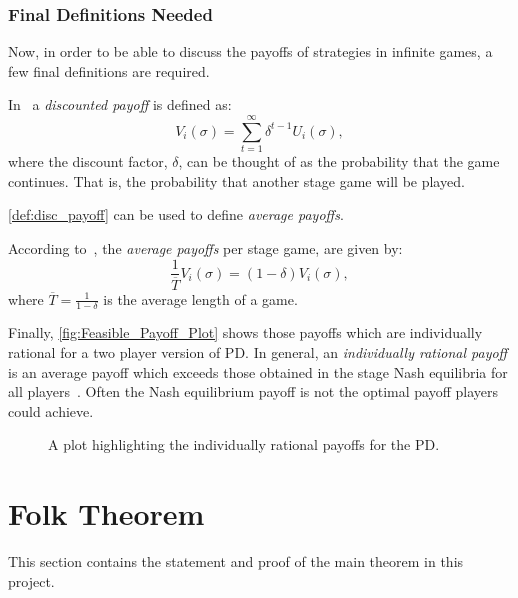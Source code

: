 \subsubsection{Final Definitions Needed}\label{subsubsec:Final_Defs_Needed}
Now, in order to be able to discuss the payoffs of strategies in infinite games,
a few final definitions are required.

\begin{definition}
In~\cite{Knight2017b} a \textit{discounted payoff} is defined as:
\begin{equation}
    V_{i}(\sigma) = \sum_{t=1}^{\infty}{\delta^{t-1}U_{i}(\sigma)},
\end{equation}
where the discount factor, \(\delta \), can be thought of as the probability
that the game continues. That is, the probability that another stage game will
be played. 
\end{definition}\label{def:disc_payoff}

\autoref{def:disc_payoff} can be used to define \textit{average payoffs}.

\begin{definition}
    According to~\cite{Knight2017b}, the \textit{average payoffs} per stage
    game, are given by:
   \begin{equation}
        \frac{1}{\overline{T}}V_{i}(\sigma) = (1-\delta)V_{i}(\sigma),    
    \end{equation}
    where \(\overline{T} = \frac{1}{1-\delta}\) is the average length of a game. 
\end{definition}

Finally, \autoref{fig:Feasible_Payoff_Plot} shows those payoffs which are
individually rational for a two player version of PD\@. In
general, an \textit{individually rational payoff} is an average payoff which
exceeds those obtained in the stage Nash equilibria for all
players~\cite{Knight2017b}. Often the Nash equilibrium payoff is not the
optimal payoff players could achieve.

\begin{figure}
    \centering
    
    \caption{A plot highlighting the individually rational payoffs for the PD.}\label{fig:Feasible_Payoff_Plot}
\end{figure}

\section{Folk Theorem}\label{sec:Folk_Thm}
This section contains the statement and proof of the main theorem in this project.

